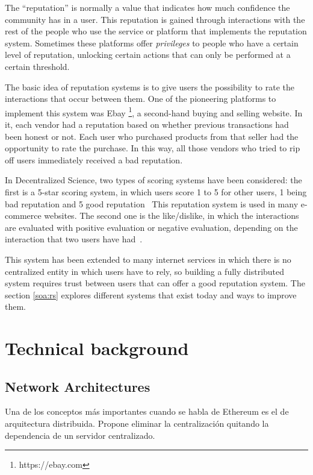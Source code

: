 The ``reputation'' is normally a value that indicates how much confidence the
community has in a user. This reputation is gained through interactions with the
rest of the people who use the service or platform that implements the
reputation system. Sometimes these platforms offer \emph{privileges} to people
who have a certain level of reputation, unlocking certain actions that can only
be performed at a certain threshold.

The basic idea of reputation systems is to give users the possibility to rate
the interactions that occur between them. One of the pioneering platforms to
implement this system was Ebay \footnote{https://ebay.com}, a second-hand buying
and selling website. In it, each vendor had a reputation based on whether
previous transactions had been honest or not. Each user who purchased products
from that seller had the opportunity to rate the purchase. In this way, all
those vendors who tried to rip off users immediately received a bad reputation.

In Decentralized Science, two types of scoring systems have been considered: the
first is a 5-star scoring system, in which users score 1 to 5 for other users, 1
being bad reputation and 5 good reputation~\cite{} This reputation system is
used in many e-commerce websites. The second one is the like/dislike, in which
the interactions are evaluated with positive evaluation or negative evaluation,
depending on the interaction that two users have had~\cite{}.

This system has been extended to many internet services in which there is no
centralized entity in which users have to rely, so building a fully distributed
system requires trust between users that can offer a good reputation system. The
section \ref{soa:rs} explores different systems that exist today and ways to
improve them.

\section{Technical background}
\label{tb}
\subsection{Network Architectures}
\label{tb:na}
 Una de los conceptos más importantes cuando se
habla de Ethereum es el de arquitectura distribuida. Propone eliminar la
centralización quitando la dependencia de un servidor centralizado.

